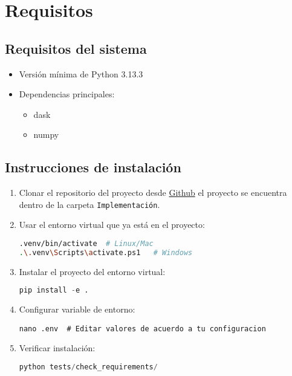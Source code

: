 	\section{Requisitos}
	\subsection{Requisitos del sistema}
	\begin{itemize}
		\item Versión mínima de Python 3.13.3
		\item Dependencias principales:
		\begin{itemize}
			\item dask
			\item numpy
		\end{itemize}
	\end{itemize}


	\subsection{Instrucciones de instalaci\'on}
	\begin{enumerate}
		\item Clonar el repositorio del proyecto desde \href{https://github.com/Ic3manMtz/Servicio-Social.git}{Github} el proyecto se encuentra dentro de la carpeta \texttt{Implementaci\'on}.
		\item Usar el entorno virtual que ya está en el proyecto:
		\begin{lstlisting}[language=bash]
.venv/bin/activate  # Linux/Mac
.\.venv\Scripts\activate.ps1   # Windows
		\end{lstlisting}
		

		\item Instalar el proyecto del entorno virtual:
		\begin{lstlisting}[language=python]
pip install -e .
		\end{lstlisting}
		\item Configurar variable de entorno:
		\begin{lstlisting}
nano .env  # Editar valores de acuerdo a tu configuracion
		\end{lstlisting}
		\item Verificar instalaci\'on:
		\begin{lstlisting}[language=python]
python tests/check_requirements/
		\end{lstlisting}
	\end{enumerate}

